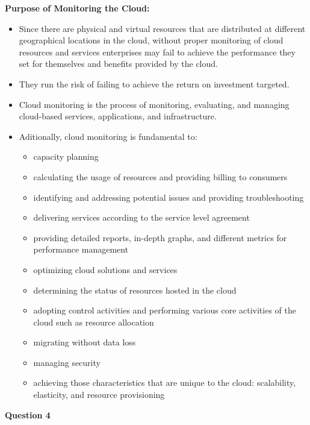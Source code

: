 \documentclass[a4paper, 12pt]{article}
\begin{document}
\textbf{Purpose of Monitoring the Cloud:}
\begin{itemize}
\item
Since there are physical and virtual resources that are distributed at different geographical locations in the cloud, without proper monitoring of cloud resources and services enterprises may fail to achieve the performance they set for themselves and benefits provided by the cloud. 
\item
They run the risk of failing to achieve the return on investment targeted.
\item
Cloud monitoring is the process of monitoring, evaluating, and managing cloud-based services, applications, and infrastructure.
\item
Aditionally, cloud monitoring is fundamental to:
\begin{itemize}
\item
capacity planning
\item
calculating the usage of resources and providing billing to consumers
\item
identifying and addressing potential issues and providing troubleshooting
\item
delivering services according to the service level agreement
\item
providing detailed reports, in-depth graphs, and different metrics for performance management
\item
optimizing cloud solutions and services
\item
determining the status of resources hosted in the cloud
\item
adopting control activities and performing various core activities of the cloud such as resource allocation
\item
migrating without data loss
\item
managing security
\item
achieving those characteristics that are unique to the cloud: scalability, elasticity, and resource provisioning
\end{itemize}
\end{itemize}


\newpage
\begin{center}
	\textbf{Question 4}
\end{center}
\end{document}
